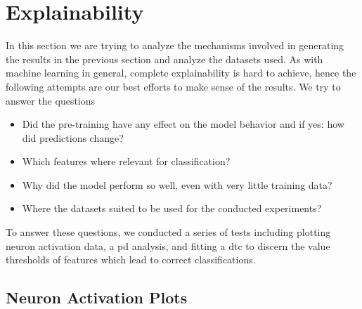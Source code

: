 \clearpage







\FloatBarrier

\section{Explainability} \label{sec:results:explainability}

In this section we are trying to analyze the mechanisms involved in generating the results in the previous section and analyze the datasets used. As with machine learning in general, complete explainability is hard to achieve, hence the following attempts are our best efforts to make sense of the results. We try to answer the questions

\begin{itemize}
	\item Did the pre-training have any effect on the model behavior and if yes: how did predictions change?
	\item Which features where relevant for classification? 
	\item Why did the model perform so well, even with very little training data?
	\item Where the datasets suited to be used for the conducted experiments?
\end{itemize}

To answer these questions, we conducted a series of tests including plotting neuron activation data, a \gls{pd} analysis, and fitting a \gls{dtc} to discern the value thresholds of features which lead to correct classifications. 

\subsection{Neuron Activation Plots}

